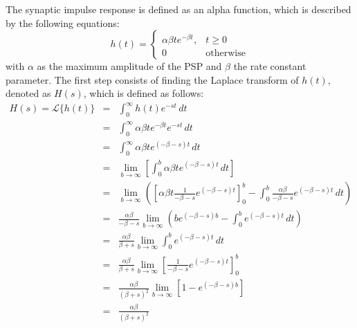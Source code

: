 \documentclass[12pt,twoside]{article}
\begin{document}
The synaptic impulse response is defined as an alpha function, which is described by the following equations:
\begin{equation}\label{my_first_eqn}
	h(t) =     
	\begin{cases}
      \alpha \beta t e^{-\beta t}, & t \geq 0\\
      0 & \text{otherwise}
    \end{cases}
\end{equation}
with $\alpha$ as the maximum amplitude of the PSP and $\beta$ the rate constant parameter. The first step consists of finding the Laplace transform of $h(t)$, denoted as $H(s)$, which is defined as follows:
\begin{eqnarray}
    H(s) = \mathcal{L}\{h(t)\} &=& \int_{0}^{\infty} h(t)e^{-st} \,dt \\
    &=& \int_{0}^{\infty} \alpha \beta t e^{-\beta t}e^{-st} \,dt \\
    &=& \int_{0}^{\infty} \alpha \beta t e^{(-\beta-s) t} \,dt \\
    &=& \lim_{b\to\infty} \left[ \int_{0}^{b} \alpha \beta t e^{(-\beta-s) t} \,dt\right]\\
    &=& \lim_{b\to\infty} \left(\left[ \alpha \beta t \frac{1}{-\beta -s}e^{(-\beta-s) t} \right]_0^b - \int_{0}^{b} \frac{\alpha \beta}{-\beta-s}e^{(-\beta-s) t}\,dt\right)\\
    &=& \frac{\alpha \beta}{-\beta -s}\lim_{b\to\infty}\left(be^{(-\beta -s)b}- \int_{0}^{b} e^{(-\beta-s) t}\,dt\right)\\
    &=&\frac{\alpha \beta}{\beta + s}\lim_{b\to\infty} \int_{0}^{b}e^{(-\beta -s)t}\,dt\\
    &=&\frac{\alpha \beta}{\beta + s}\lim_{b\to\infty} \left[ \frac{1}{-\beta -s}e^{(-\beta-s) t} \right]_0^b\\
    &=&\frac{\alpha \beta}{(\beta + s)^{2}}\lim_{b\to\infty} \left[1 - e^{(-\beta -s)b} \right]\\
    &=& \frac{\alpha \beta}{(\beta + s)^{2}}
\end{eqnarray}
\end{document}
